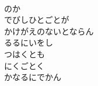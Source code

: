 \documentclass[10pt,b5j]{tarticle} %
\begin{document}
\begin{enumerate}
\begin{minipage}[c]{\blocksize}
    \end{minipage}
    \begin{minipage}[c]{\blocksize}
        
        \vspace{\linespace}
        \item~\\
        のか\\
        でびしひとごとが\\
        かけがえのないとならん\\
        るるにいをし\\
        つはくとも\\
        にくごとく\\
        かなるにでかん

    
    \end{minipage}
\end{enumerate} %
\end{document}
